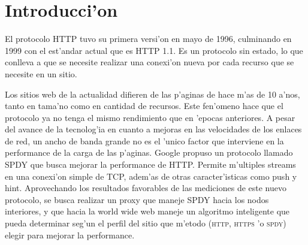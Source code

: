 \chapter{Introducci'on}

El protocolo HTTP tuvo su primera versi'on en mayo de 1996, culminando en 1999 con el est'andar actual que es HTTP 1.1. Es un protocolo sin estado, lo que conlleva a que se necesite realizar una conexi'on nueva por cada recurso que se necesite en un sitio.

Los sitios web de la actualidad difieren de las p'aginas de hace m'as de 10 a'nos, tanto en tama'no como en cantidad de recursos. Este fen'omeno hace que el protocolo ya no tenga el mismo rendimiento que en 'epocas anteriores. A pesar del avance de la tecnolog'ia en cuanto a mejoras en las velocidades de los enlaces de red, un ancho de banda grande no es el 'unico factor que interviene en la performance de la carga de las p'aginas.
Google propuso un protocolo llamado SPDY que busca mejorar la performance de HTTP. Permite m'ultiples streams en una conexi'on simple de TCP, adem'as de otras caracter'isticas como push y hint.
Aprovechando los resultados favorables de las mediciones de este nuevo protocolo, se busca realizar un proxy que maneje SPDY hacia los nodos interiores, y que hacia la world wide web maneje un algoritmo inteligente que pueda determinar seg'un el perfil del sitio que m'etodo (\textsc{http}, \textsc{https} 'o \textsc{spdy}) elegir para mejorar la performance. 
